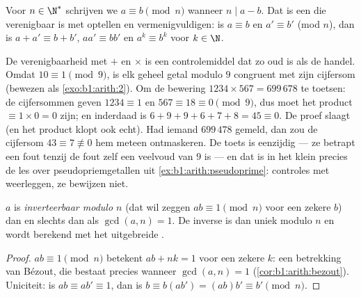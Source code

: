 \begin{definition}\label{def:b1:arith:congruence}
Voor $n \in \N^*$ schrijven we $a \equiv b \pmod n$
wanneer $n \mid a - b$. Dat is een  die verenigbaar is
met optellen en vermenigvuldigen: is $a \equiv b$ en $a' \equiv b'$
(mod $n$), dan is $a + a' \equiv b + b'$, $aa' \equiv bb'$ en $a^k \equiv
b^k$ voor $k \in \N$.
\end{definition}

\begin{example}[De negenproef]\label{ex:b1:arith:castingnines}
De verenigbaarheid met $+$ en $\times$ is een controlemiddel dat zo oud
is als de handel. Omdat $10 \equiv 1 \pmod 9$, is elk geheel getal modulo
$9$ congruent met zijn cijfersom (bewezen als \cref{exo:b1:arith:2}). Om
de bewering $1234 \times 567 = 699\,678$ te toetsen: de cijfersommen
geven $1234 \equiv 1$ en $567 \equiv 18 \equiv 0 \pmod 9$, dus moet het
product $\equiv 1 \times 0 = 0$ zijn; en inderdaad is $6 + 9 + 9 + 6 + 7
+ 8 = 45 \equiv 0$. De proef slaagt (en het product klopt ook echt). Had
iemand $699\,478$ gemeld, dan zou de cijfersom $43 \equiv 7 \not\equiv 0$
hem meteen ontmaskeren. De toets is eenzijdig --- ze betrapt een fout
tenzij de fout zelf een veelvoud van $9$ is --- en dat is in het klein
precies de les over pseudopriemgetallen uit
\cref{ex:b1:arith:pseudoprime}: controles met  weerleggen,
ze bewijzen niet.
\end{example}

\begin{proposition}\label{prop:b1:arith:invmod}
$a$ is \emph{inverteerbaar modulo $n$} (dat wil zeggen $ab \equiv 1 \pmod
n$ voor een zekere $b$) dan en slechts dan als $\gcd(a, n) = 1$. De
inverse is dan uniek modulo $n$ en wordt berekend met het uitgebreide
.
\end{proposition}

\begin{proof}
$ab \equiv 1 \pmod n$ betekent $ab + nk = 1$ voor een zekere $k$: een
betrekking van Bézout, die bestaat precies wanneer $\gcd(a,n) = 1$
(\cref{cor:b1:arith:bezout}). Uniciteit: is $ab \equiv ab' \equiv 1$, dan
is $b \equiv b(ab') = (ab)b' \equiv b' \pmod n$.
\end{proof}

